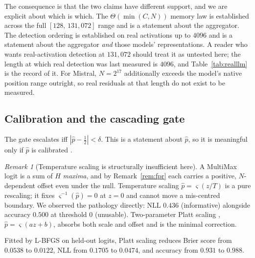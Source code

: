 \documentclass[10pt]{article}
\theoremstyle{plain}
\theoremstyle{definition}
\theoremstyle{remark}
\newtheorem{remark}[theorem]{Remark}
\begin{document}
The consequence is that the two claims have different support, and we are explicit about
which is which. The $\Theta(\min(C,N))$ memory law is established across the full
$[128,\,131{,}072]$ range and is a statement about the aggregator. The detection ordering
is established on real activations up to $4096$ and is a statement about the aggregator
\emph{and} those models' representations. A reader who wants real-activation detection at
$131{,}072$ should treat it as untested here; the length at which real detection was last
measured is $4096$, and Table~\ref{tab:realllm} is the record of it. For Mistral,
$N{=}2^{17}$ additionally exceeds the model's native position range outright, so real
residuals at that length do not exist to be measured.

\subsection{Calibration and the cascading gate}
\label{sec:cascade}
The gate escalates iff $|\hat p-\tfrac12|<\delta$. This is a statement about $\hat p$, so
it is meaningful only if $\hat p$ is calibrated \citep{guo2017calibration}.

\begin{remark}[Temperature scaling is structurally insufficient here]
\label{rem:platt}
A MultiMax logit is a sum of $H$ \emph{maxima}, and by Remark~\ref{rem:fpr} each carries a
positive, $N$-dependent offset even under the null. Temperature scaling
$\hat p=\varsigma(z/T)$ is a pure rescaling; it fixes $\varsigma^{-1}(\hat p)=0$ at $z=0$
and cannot move a mis-centred boundary. We observed the pathology directly: NLL $0.436$
(informative) alongside accuracy $0.500$ at threshold $0$ (unusable). Two-parameter Platt
scaling \citep{platt1999probabilistic}, $\hat p=\varsigma(az+b)$, absorbs both scale and
offset and is the minimal correction.
\end{remark}

Fitted by L-BFGS on held-out logits, Platt scaling reduces Brier score
\citep{brier1950verification} from $0.0538$ to $0.0122$, NLL from $0.1705$ to $0.0474$,
and accuracy from $0.931$ to $0.988$.
\end{document}
